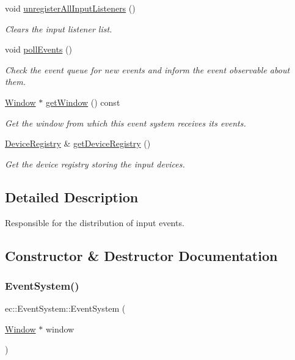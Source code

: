 \begin{DoxyCompactItemize}
void \mbox{\hyperlink{classec_1_1_event_system_a142264d74594a6584fd06a00eec45345}{unregister\+All\+Input\+Listeners}} ()
\begin{DoxyCompactList}\small\item\em Clears the input listener list. \end{DoxyCompactList}\item 
void \mbox{\hyperlink{classec_1_1_event_system_a547dbafa5aa6f770c8a839d81a369ea6}{poll\+Events}} ()
\begin{DoxyCompactList}\small\item\em Check the event queue for new events and inform the event observable about them. \end{DoxyCompactList}\item 
\mbox{\hyperlink{classec_1_1_window}{Window}} $\ast$ \mbox{\hyperlink{classec_1_1_event_system_a49289b02be391da14f42cef7bbb63fc3}{get\+Window}} () const
\begin{DoxyCompactList}\small\item\em Get the window from which this event system receives its events. \end{DoxyCompactList}\item 
\mbox{\hyperlink{classec_1_1_device_registry}{Device\+Registry}} \& \mbox{\hyperlink{classec_1_1_event_system_a8c84a98e39be4a735dc882e19e4b309a}{get\+Device\+Registry}} ()
\begin{DoxyCompactList}\small\item\em Get the device registry storing the input devices. \end{DoxyCompactList}\end{DoxyCompactItemize}


\subsection{Detailed Description}
Responsible for the distribution of input events. 

\subsection{Constructor \& Destructor Documentation}
\mbox{\label{classec_1_1_event_system_aebdeca9447afa113154fb2bab35c274c}} 
\subsubsection{\texorpdfstring{Event\+System()}{EventSystem()}}
{\footnotesize\ttfamily ec\+::\+Event\+System\+::\+Event\+System (\begin{DoxyParamCaption}\item[{\mbox{\hyperlink{classec_1_1_window}{Window}} $\ast$}]{window }\end{DoxyParamCaption})\hspace{0.3cm}{\ttfamily [explicit]}}

